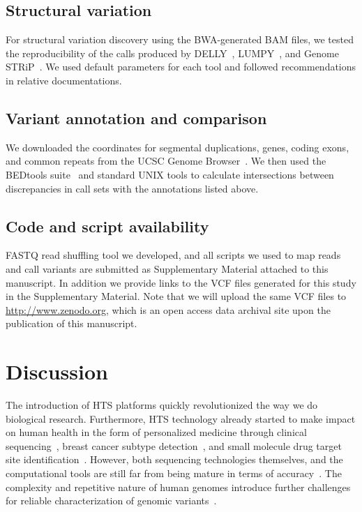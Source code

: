 \documentclass[10pt,a4paper]{article}
\begin{document}
\subsection*{Structural variation}

For structural variation discovery using the BWA-generated BAM files, we tested the reproducibility of the calls produced by DELLY~\cite{Rausch2012}, LUMPY~\cite{Layer2014}, and Genome STRiP~\cite{Handsaker2011,Handsaker2015}. 
We used default parameters for each tool and followed recommendations in relative documentations.


\subsection*{Variant annotation and comparison}

We downloaded the coordinates for segmental duplications, genes, coding exons, and common repeats from the UCSC Genome Browser~\cite{Kent2002}. 
We then used the BEDtools suite~\cite{Quinlan2010a} and standard UNIX tools 
 to calculate intersections between discrepancies in call sets with the annotations listed above.

\subsection*{Code and script availability} FASTQ read shuffling tool we developed, and all scripts we used to map reads and call variants
 are submitted as Supplementary Material attached to this manuscript. In addition we provide links to the VCF files generated for this study in the Supplementary Material. Note that we will upload the same VCF files to \url{http://www.zenodo.org}, which is an open access data archival site upon the publication of this manuscript.

\section*{Discussion}

The introduction of HTS platforms  quickly revolutionized the way we do biological research\cite{Mardis2008,Metzker2010}. Furthermore, HTS technology  already started to make impact on human health in the form of personalized medicine
through clinical sequencing~\cite{Biesecker2009}, breast cancer subtype detection~\cite{Bosdet2013}, and small molecule drug target site identification~\cite{Rodriguez2014}. However, both sequencing technologies themselves,%
 and the computational tools are still far from being mature in terms of accuracy~\cite{Alkan2011,Nielsen2011}. The complexity and repetitive nature of human genomes introduce further challenges for reliable characterization of genomic variants~\cite{Treangen2012}.
\end{document}
